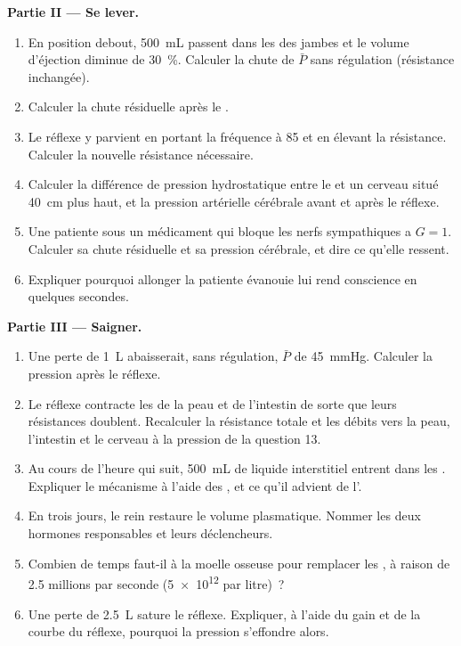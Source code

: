\begin{problem}
\medskip
\noindent\textbf{Partie II --- Se lever.}
\begin{enumerate}[resume]
  \item En position debout, \qty{500}{mL} passent dans les  des
        jambes et le volume d'éjection diminue de \qty{30}{\%}. Calculer
        la chute de $\bar P$ sans régulation (résistance inchangée).
  \item Calculer la chute résiduelle après le .
  \item Le réflexe y parvient en portant la fréquence à 85 et en élevant
        la résistance. Calculer la nouvelle résistance nécessaire.
  \item Calculer la différence de pression hydrostatique entre le  et
        un cerveau situé \qty{40}{cm} plus haut, et la pression
        artérielle cérébrale avant et après le réflexe.
  \item Une patiente sous un médicament qui bloque les nerfs sympathiques
        a $G = 1$. Calculer sa chute résiduelle et sa pression cérébrale,
        et dire ce qu'elle ressent.
  \item Expliquer pourquoi allonger la patiente évanouie lui rend
        conscience en quelques secondes.
\end{enumerate}

\medskip
\noindent\textbf{Partie III --- Saigner.}
\begin{enumerate}[resume]
  \item Une perte de \qty{1}{L} abaisserait, sans régulation, $\bar P$ de
        \qty{45}{mmHg}. Calculer la pression après le réflexe.
  \item Le réflexe contracte les  de la peau et de l'intestin
        de sorte que leurs résistances doublent. Recalculer la résistance
        totale et les débits vers la peau, l'intestin et le cerveau à la
        pression de la question 13.
  \item Au cours de l'heure qui suit, \qty{500}{mL} de liquide
        interstitiel entrent dans les . Expliquer le mécanisme
        à l'aide des , et ce qu'il advient de
        l'.
  \item En trois jours, le rein restaure le volume plasmatique. Nommer
        les deux hormones responsables et leurs déclencheurs.
  \item Combien de temps faut-il à la moelle osseuse pour remplacer les
        , à raison de \num{2.5} millions par seconde
        (\num{5e12} par litre)~?
  \item Une perte de \qty{2.5}{L} sature le réflexe. Expliquer, à l'aide
        du gain et de la courbe du réflexe, pourquoi la pression
        s'effondre alors.
\end{enumerate}


\end{problem}

